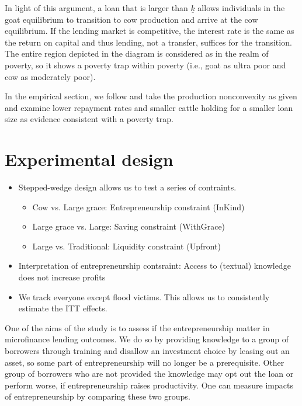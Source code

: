 	In light of this argument, a loan that is larger than $\underline{k}$ allows individuals in the goat equilibrium to transition to cow production and arrive at the cow equilibrium. If the lending market is competitive, the interest rate is the same as the return on capital and thus lending, not a transfer, suffices for the transition. The entire region depicted in the diagram is considered as in the realm of poverty, so it shows a poverty trap within poverty (i.e., goat as ultra poor and cow as moderately poor). 

	In the empirical section, we follow \citet{BandieraBRAC2017} and take the production nonconvexity as given and examine lower repayment rates and smaller cattle holding for a smaller loan size as evidence consistent with a poverty trap. 

\section{Experimental design}
\label{SecExperimentalDesign}


\begin{mdframed}[style={SecItemize}, frametitle={Experimental design}]
\begin{itemize}
\vspace{1.0ex}\setlength{\itemsep}{1.0ex}\setlength{\baselineskip}{12pt}
\item	Stepped-wedge design allows us to test a series of contraints.
	\begin{itemize}
	\vspace{1.0ex}\setlength{\itemsep}{1.0ex}\setlength{\baselineskip}{12pt}
	\item	Cow vs. Large grace: Entrepreneurship constraint (\textsf{InKind})
	\item	Large grace vs. Large: Saving constraint (\textsf{WithGrace})
	\item	Large vs. Traditional: Liquidity constraint (\textsf{Upfront})
	\end{itemize}
\item	Interpretation of entrepreneurship contsraint: Access to (textual) knowledge does not increase profits
\item	We track everyone except flood victims. This allows us to consistently estimate the ITT effects.
\end{itemize}
\end{mdframed}

	One of the aims of the study is to assess if the entrepreneurship matter in microfinance lending outcomes. We do so by providing knowledge to a group of borrowers through training and disallow an investment choice by leasing out an asset, so some part of entrepreneurship will no longer be a prerequisite. Other group of borrowers who are not provided the knowledge may opt out the loan or perform worse, if entrepreneurship raises productivity. One can measure impacts of entrepreneurship by comparing these two groups.

